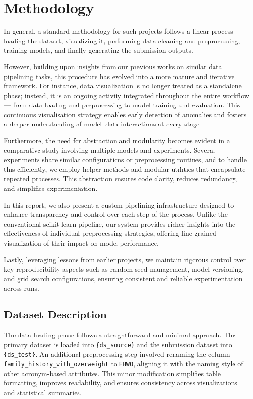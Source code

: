 \chapter{Methodology}\label{ch:methodology}

In general, a standard methodology for such projects follows a linear process — loading the dataset, visualizing it,
performing data cleaning and preprocessing, training models, and finally generating the submission outputs.

However, building upon insights from our previous works on similar data pipelining tasks, this procedure has evolved
into a more mature and iterative framework.
For instance, data visualization is no longer treated as a standalone phase; instead, it is an ongoing activity
integrated throughout the entire workflow — from data loading and preprocessing to model training and evaluation.
This continuous visualization strategy enables early detection of anomalies and fosters a deeper understanding of
model–data interactions at every stage. \cite{DNN_Anirudh,DNN_Shreya}

Furthermore, the need for abstraction and modularity becomes evident in a comparative study involving multiple models
and experiments.
Several experiments share similar configurations or preprocessing routines, and to handle this efficiently, we employ
helper methods and modular utilities that encapsulate repeated processes.
This abstraction ensures code clarity, reduces redundancy, and simplifies experimentation.

In this report, we also present a custom pipelining infrastructure designed to enhance transparency and control over
each step of the process.
Unlike the conventional scikit-learn pipeline, our system provides richer insights into the effectiveness of individual
preprocessing strategies, offering fine-grained visualization of their impact on model performance.

Lastly, leveraging lessons from earlier projects, we maintain rigorous control over key reproducibility aspects such as
random seed management, model versioning, and grid search configurations, ensuring consistent and reliable
experimentation across runs.


\section{Dataset Description}\label{sec:dataset-description}
The data loading phase follows a straightforward and minimal approach.
The primary dataset is loaded into \texttt{\{ds\_source\}} and the submission dataset into \texttt{\{ds\_test\}}.
An additional preprocessing step involved renaming the column \texttt{family\_history\_with\_overweight} to \texttt{FHWO}, aligning it with the naming style of other acronym-based attributes.
This minor modification simplifies table formatting, improves readability, and ensures consistency across visualizations and statistical summaries.


